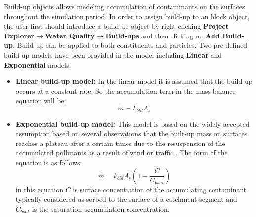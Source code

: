 Build-up objects allows modeling accumulation of contaminants on the surfaces throughout the simulation period. In order to assign build-up to an block object, the user first should introduce a build-up object by right-clicking \textbf{Project Explorer}$\rightarrow$\textbf{Water Quality}$\rightarrow$\textbf{Build-ups} and then clicking on \textbf{Add Build-up}. Build-up can be applied to both constituents and particles. Two pre-defined build-up models have been provided in the model including \textbf{Linear} and \textbf{Exponential} models: 

\begin{itemize}
\item \textbf{Linear build-up model: } In the linear model it is assumed that the build-up occurs at a constant rate. So the accumulation term in the mass-balance equation will be:
\begin{equation}
\label{eq:34}
\dot{m} = k_{bld} A_s 
\end{equation}

\item \textbf{Exponential build-up model: } This model is based on the widely accepted assumption based on several observations that the built-up mass on surfaces reaches a plateau after a certain times due to the resuspension of the accumulated pollutants as a result of wind or traffic \citep{alley1981}. The form of the equation is as follows: 
\begin{equation}
\label{eq:35}
\dot{m} = k_{bld} A_s (1-\frac{C}{C_{bsat}})
\end{equation}
in this equation $C$ is surface concentration of the accumulating contaminant typically considered as sorbed to the surface of a catchment segment and $C_{bsat}$ is the saturation accumulation concentration. 
\end{itemize}
